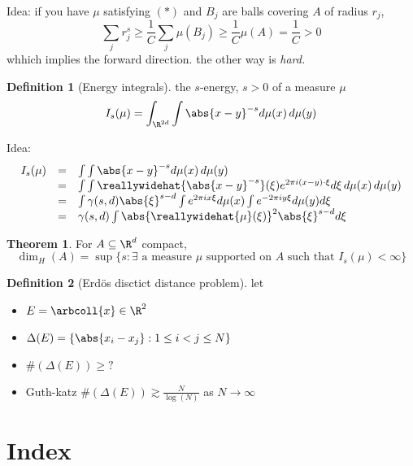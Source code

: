 \documentclass[a5paper]{article}
\theoremstyle{definition}%
\newtheorem*{theorem*}{Theorem} %
\newtheorem*{definition*}{Definition}
\numberwithin{exercise}{section}
\theoremstyle{remark}%
\begin{document}
Idea: if you have $\mu$ satisfying $(*)$ and $B_j$ are balls covering $A$ of radius $r_j$, 
\[ \sum_j r_j^s \geq \frac{1}{C} \sum_j\mu(B_j) \geq \frac{1}{C} \mu(A)= \frac{1}{C} >0\]
whhich implies the forward direction. the other way is \emph{hard.}

\begin{definition*}[Energy integrals]
the $s$-energy, $s>0$ of a measure $\mu$ 
\[I_s(\mu)=\int_{\R^{2d}}\int\abs{x-y}^{-s}d\mu(x)\, d\mu(y)  \]
\end{definition*}

Idea:
\[\begin{array}{rcl}
I_s(\mu)&=&\int\int\abs{x-y}^{-s}d\mu(x)\, d\mu(y)\\
	&=& \int\int \reallywidehat{\abs{x-y}^{-s}}(\xi) e^{2\pi i (x-y)\cdot\xi} d\xi\, d\mu(x)\, d\mu(y)\\
	&=& \int \gamma(s,d)\abs{\xi}^{s-d} \int e^{2\pi i x\xi}d\mu(x)\int e^{-2\pi i y\xi}d\mu(y)d\xi\\
	&=& \gamma(s,d)\int \abs{\reallywidehat{\mu}(\xi)}^2\abs{\xi}^{s-d}d\xi\\
\end{array}\]

\begin{highlight}
\begin{theorem*}
For $A\subseteq\R^d$ compact, 
\[\dim_H(A)=\sup\{s: \exists \text{ a measure } \mu \text{ supported on } A \text{ such that } I_s(\mu)<\infty\} \]
\end{theorem*}
\end{highlight}

\begin{highlight}
\begin{definition*}[Erd\"os disctict distance problem]
let 
\begin{itemize}
\item $E=\arbcoll{x}\in \R^2$
\item $\Delta(E)=\{\abs{x_i-x_j}:1\leq i<j\leq N\}$
\item $\#(\Delta(E))\geq ?$
\item Guth-katz $\#(\Delta(E))\gtrsim\frac{N}{\log(N)}$ as $N\to\infty$
\end{itemize}

\end{definition*}
\end{highlight}


\pagebreak
\section{Index}
\printindex
\end{document}
